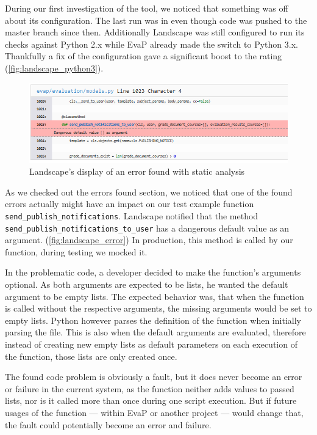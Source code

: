 During our first investigation of the tool, we noticed that something was off about its configuration.
The last run was in %
even though code was pushed to the master branch since then.
Additionally Landscape was still configured to run its checks against Python 2.x while EvaP already made the switch to Python 3.x.
Thankfully a fix of the configuration gave a significant boost to the rating (\autoref{fig:landscape_python3}).

\begin{figure}[h]
    \centering
    \includegraphics[width=\textwidth, keepaspectratio]{graphics/landscape_error}
    \caption{Landscape's display of an error found with static analysis}
    \label{fig:landscape_error}
\end{figure}

As we checked out the errors found section, we noticed that one of the found errors actually might have an impact on our test example function \texttt{send\_publish\_notifications}.
Landscape notified that the method \texttt{send\_publish\_notifications\_to\_user} has a dangerous default value as an argument.
(\autoref{fig:landscape_error})
In production, this method is called by our function, during testing we mocked it.

In the problematic code, a developer decided to make the function's arguments optional.
As both arguments are expected to be lists, he wanted the default argument to be empty lists.
The expected behavior was, that when the function is called without the respective arguments, the missing arguments would be set to empty lists.
Python however parses the definition of the function when initially parsing the file.
This is also when the default arguments are evaluated, therefore instead of creating new empty lists as default parameters on each execution of the function, those lists are only created once.

The found code problem is obviously a fault, but it does never become an error or failure in the current system, as the function neither adds values to passed lists, nor is it called more than once during one script execution.
But if future usages of the function --- within EvaP or another project --- would change that, the fault could potentially become an error and failure.

